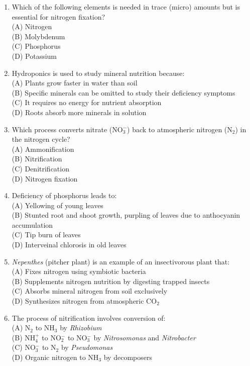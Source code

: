 \documentclass{article}
\begin{document}
\begin{enumerate}[label=Q\arabic*.]
\item Which of the following elements is needed in trace (micro) amounts but is essential for nitrogen fixation?
\\(A) Nitrogen
\\(B) Molybdenum
\\(C) Phosphorus
\\(D) Potassium

\item Hydroponics is used to study mineral nutrition because:
\\(A) Plants grow faster in water than soil
\\(B) Specific minerals can be omitted to study their deficiency symptoms
\\(C) It requires no energy for nutrient absorption
\\(D) Roots absorb more minerals in solution

\item Which process converts nitrate (NO$_3^-$) back to atmospheric nitrogen (N$_2$) in the nitrogen cycle?
\\(A) Ammonification
\\(B) Nitrification
\\(C) Denitrification
\\(D) Nitrogen fixation

\item Deficiency of phosphorus leads to:
\\(A) Yellowing of young leaves
\\(B) Stunted root and shoot growth, purpling of leaves due to anthocyanin accumulation
\\(C) Tip burn of leaves
\\(D) Interveinal chlorosis in old leaves

\item \textit{Nepenthes} (pitcher plant) is an example of an insectivorous plant that:
\\(A) Fixes nitrogen using symbiotic bacteria
\\(B) Supplements nitrogen nutrition by digesting trapped insects
\\(C) Absorbs mineral nitrogen from soil exclusively
\\(D) Synthesizes nitrogen from atmospheric CO$_2$

\item The process of nitrification involves conversion of:
\\(A) N$_2$ to NH$_3$ by \textit{Rhizobium}
\\(B) NH$_4^+$ to NO$_2^-$ to NO$_3^-$ by \textit{Nitrosomonas} and \textit{Nitrobacter}
\\(C) NO$_3^-$ to N$_2$ by \textit{Pseudomonas}
\\(D) Organic nitrogen to NH$_3$ by decomposers


\end{enumerate}
\end{document}
